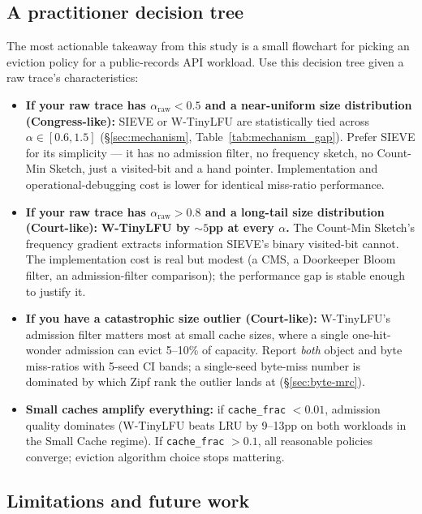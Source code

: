 \subsection{A practitioner decision tree}

The most actionable takeaway from this study is a small flowchart for picking
an eviction policy for a public-records API workload. Use this decision tree
given a raw trace's characteristics:

\begin{itemize}\setlength{\itemsep}{2pt}
  \item \textbf{If your raw trace has $\alpha_{\text{raw}} < 0.5$ and a
  near-uniform size distribution (Congress-like):} SIEVE or W-TinyLFU are
  statistically tied across $\alpha \in [0.6, 1.5]$
  (\S\ref{sec:mechanism}, Table~\ref{tab:mechanism_gap}). Prefer SIEVE for
  its simplicity --- it has no admission filter, no frequency sketch, no
  Count-Min Sketch, just a visited-bit and a hand pointer. Implementation
  and operational-debugging cost is lower for identical miss-ratio
  performance.
  \item \textbf{If your raw trace has $\alpha_{\text{raw}} > 0.8$ and a
  long-tail size distribution (Court-like):} \textbf{W-TinyLFU by $\sim 5$pp
  at every $\alpha$.} The Count-Min Sketch's frequency gradient extracts
  information SIEVE's binary visited-bit cannot. The implementation cost is
  real but modest (a CMS, a Doorkeeper Bloom filter, an admission-filter
  comparison); the performance gap is stable enough to justify it.
  \item \textbf{If you have a catastrophic size outlier (Court-like):}
  W-TinyLFU's admission filter matters most at small cache sizes, where a
  single one-hit-wonder admission can evict 5--10\% of capacity. Report
  \emph{both} object and byte miss-ratios with 5-seed CI bands; a
  single-seed byte-miss number is dominated by which Zipf rank the outlier
  lands at (\S\ref{sec:byte-mrc}).
  \item \textbf{Small caches amplify everything:} if \texttt{cache\_frac}
  $< 0.01$, admission quality dominates (W-TinyLFU beats LRU by 9--13pp on
  both workloads in the Small Cache regime). If \texttt{cache\_frac} $>
  0.1$, all reasonable policies converge; eviction algorithm choice stops
  mattering.
\end{itemize}

\subsection{Limitations and future work}

